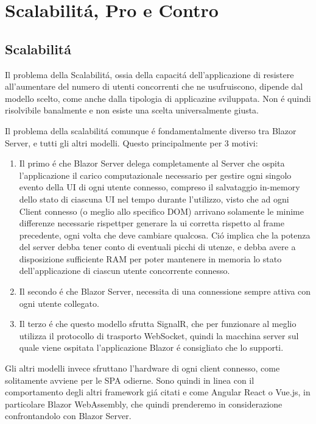 \chapter{Scalabilit\'a, Pro e Contro}\label{cap:scalprocont}
\section{Scalabilit\'a}\label{sez:scalabilita}
Il problema della Scalabilit\'a, ossia della capacit\'a dell'applicazione di resistere all'aumentare del numero di utenti concorrenti che ne usufruiscono, dipende dal modello scelto, come anche dalla tipologia di applicazine sviluppata.
Non \'e quindi risolvibile banalmente e non esiste una scelta universalmente giusta.

Il problema della scalabilit\'a comunque \'e fondamentalmente diverso tra Blazor Server, e tutti gli altri modelli.
Questo principalmente per 3 motivi:
\begin{enumerate}
	\item Il primo \'e che Blazor Server delega completamente al Server che ospita l'applicazione il carico computazionale necessario per gestire ogni singolo evento della UI di ogni utente connesso, compreso il salvataggio in-memory  dello stato di ciascuna UI nel tempo durante l'utilizzo, visto che ad ogni Client connesso (o meglio allo specifico DOM) arrivano solamente le minime differenze necessarie rispettper generare la ui corretta rispetto al frame precedente, ogni volta che deve cambiare qualcosa.
	Ci\'o implica che la potenza del server debba tener conto di eventuali picchi di utenze, e debba avere a disposizione sufficiente RAM per poter mantenere in memoria lo stato dell'applicazione di ciascun utente concorrente connesso.
	
	\item Il secondo \'e che Blazor Server, necessita di una connessione sempre attiva con ogni utente collegato.
	
	\item Il terzo \'e che questo modello sfrutta SignalR, che per funzionare al meglio utilizza il protocollo di trasporto WebSocket, quindi la macchina server sul quale viene ospitata l'applicazione Blazor \'e consigliato che lo supporti.
\end{enumerate}

Gli altri modelli invece sfruttano l'hardware di ogni client connesso, come solitamente avviene per le SPA odierne.
Sono quindi in linea con il comportamento degli altri framework gi\'a citati e come Angular React o Vue.js, in particolare Blazor WebAssembly, che quindi prenderemo in considerazione confrontandolo con Blazor Server.

